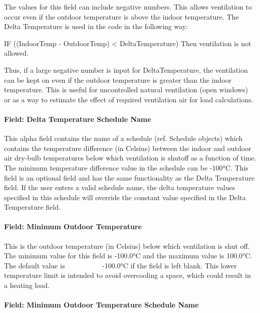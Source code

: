 The values for this field can include negative numbers. This allows ventilation to occur even if the outdoor temperature is above the indoor temperature. The Delta Temperature is used in the code in the following way:

IF ((IndoorTemp - OutdoorTemp) \textless{} DeltaTemperature) Then ventilation is not allowed.

Thus, if a large negative number is input for DeltaTemperature, the ventilation can be kept on even if the outdoor temperature is greater than the indoor temperature. This is useful for uncontrolled natural ventilation (open windows) or as a way to estimate the effect of required ventilation air for load calculations.

\paragraph{Field: Delta Temperature Schedule Name}\label{field-delta-temperature-schedule-name}

This alpha field contains the name of a schedule (ref. Schedule objects) which contains the temperature difference (in Celsius) between the indoor and outdoor air dry-bulb temperatures below which ventilation is shutoff as a function of time. The minimum temperature difference value in the schedule can be -100°C. This field is an optional field and has the same functionality as the Delta Temperature field. If the user enters a valid schedule name, the delta temperature values specified in this schedule will override the constant value specified in the Delta Temperature field.

\paragraph{Field: Minimum Outdoor Temperature}\label{field-minimum-outdoor-temperature}

This is the outdoor temperature (in Celsius) below which ventilation is shut off. The minimum value for this field is -100.0°C and the maximum value is 100.0°C. The default value is~~~~~~~~~~ -100.0°C if the field is left blank. This lower temperature limit is intended to avoid overcooling a space, which could result in a heating load.

\paragraph{Field: Minimum Outdoor Temperature Schedule Name}\label{field-minimum-outdoor-temperature-schedule-name}

